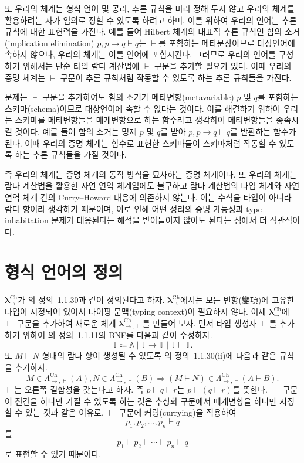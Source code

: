 \documentclass[10pt,twocolumn]{article}
\theoremstyle{definition}
\newcommand{\lch}{\bm\lambda_\to^{\text{Ch}}}
\newcommand{\lchh}{\bm\lambda_{\to,\vdash}^{\text{Ch}}}
\newcommand{\Lchh}{\Lambda_{\to,\vdash}^{\text{Ch}}}
\begin{document}
또 우리의 체계는 형식 언어 및 공리, 추론 규칙을 미리 정해 두지 않고 우리의 체계를 활용하려는 자가 임의로 정할 수 있도록 하려고 하며, 이를 위하여 우리의 언어는 추론 규칙에 대한 표현력을 가진다. 예를 들어 Hilbert 체계의 대표적 추론 규칙인 함의 소거(implication elimination) $p, p\to q\vdash q$는 $\vdash$를 포함하는 메타문장이므로 대상언어에 속하지 않으나, 우리의 체계는 이를 언어에 포함시킨다. 그러므로 우리의 언어를 구성하기 위해서는 단순 타입 람다 계산법에 $\vdash$ 구문을 추가할 필요가 있다. 이때 우리의 증명 체계는 $\vdash$ 구문이 추론 규칙처럼 작동할 수 있도록 하는 추론 규칙들을 가진다.

문제는 $\vdash$ 구문을 추가하여도 함의 소거가 메타변항(metavariable) $p$ 및 $q$를 포함하는 스키마(schema)이므로 대상언어에 속할 수 없다는 것이다. 이를 해결하기 위하여 우리는 스키마를 메타변항들을 매개변항으로 하는 함수라고 생각하여 메타변항들을 종속시킬 것이다. 예를 들어 함의 소거는 명제 $p$ 및 $q$를 받아 $p, p\to q\vdash q$를 반환하는 함수가 된다. 이때 우리의 증명 체계는 함수로 표현한 스키마들이 스키마처럼 작동할 수 있도록 하는 추론 규칙들을 가질 것이다.

즉 우리의 체계는 증명 체계의 동작 방식을 묘사하는 증명 체계이다. 또 우리의 체계는 람다 계산법을 활용한 자연 연역 체계임에도 불구하고 람다 계산법의 타입 체계와 자연 연역 체계 간의 Curry--Howard 대응\cite{howard}에 의존하지 않는다. 이는 수식을 타입이 아니라 람다 항이라 생각하기 때문이며, 이로 인해 어떤 정리의 증명 가능성과 type inhabitation 문제가 대응된다는 해석을 받아들이지 않아도 된다는 점에서 더 직관적이다.

\section{형식 언어의 정의}

$\lch$가 \cite{luswt}의 정의~1.1.30과 같이 정의된다고 하자. $\lch$에서는 모든 변항(變項)에 고유한 타입이 지정되어 있어서 타이핑 문맥(typing context)이 필요하지 않다. 이제 $\lch$에 $\vdash$ 구문을 추가하여 새로운 체계 $\lchh$를 만들어 보자. 먼저 타입 생성자 $\vdash$를 추가하기 위하여 \cite{luswt}의 정의~1.1.11의 BNF를 다음과 같이 수정하자.
$$\mathds T \Coloneqq \mathbb A\mid\mathds T\to\mathds T\mid\mathds T\vdash\mathds T.$$
또 $M\vdash N$ 형태의 람다 항이 생성될 수 있도록 \cite{luswt}의 정의~1.1.30(ii)에 다음과 같은 규칙을 추가하자.
$$M\in\Lchh(A), N\in\Lchh(B)\Rightarrow (M\vdash N)\in\Lchh(A\vdash B).$$
$\vdash$는 오른쪽 결합성을 갖는다고 하자. 즉 $p\vdash q\vdash r$는 $p\vdash (q\vdash r)$를 뜻한다. $\vdash$ 구문이 전건을 하나만 가질 수 있도록 하는 것은 추상화 구문에서 매개변항을 하나만 지정할 수 있는 것과 같은 이유로, $\vdash$ 구문에 커링(currying)을 적용하여
$$p_1, p_2, \ldots, p_n\vdash q$$
를
$$p_1 \vdash p_2\vdash\cdots\vdash p_n\vdash q$$
로 표현할 수 있기 때문이다.
\end{document}
